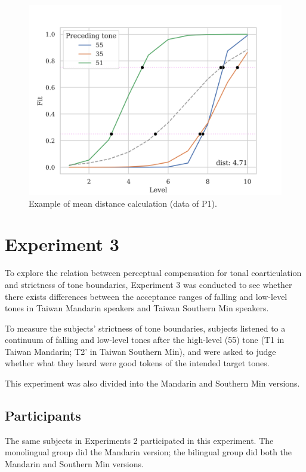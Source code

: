 \documentclass[12pt]{report}
\begin{document}
\begin{CJK}{UTF8}{bsmi}
\begin{figure}[h]
\centering
\includegraphics[width=\textwidth]{Figures/E2/ProcessedExample.png}
\caption{Example of mean distance calculation (data of P1).}
\label{Figure:E2ProcessedExample}
\end{figure}

\section{Experiment 3}\label{section:Experiment3}
To explore the relation between perceptual compensation for tonal coarticulation and strictness of tone boundaries, Experiment 3 was conducted to see whether there exists differences between the acceptance ranges of falling and low-level tones in Taiwan Mandarin speakers and Taiwan Southern Min speakers.

To measure the subjects' strictness of tone boundaries, subjects listened to a continuum of falling and low-level tones after the high-level (55) tone (T1 in Taiwan Mandarin; T2' in Taiwan Southern Min), and were asked to judge whether what they heard were good tokens of the intended target tones.

This experiment was also divided into the Mandarin and Southern Min versions.

\subsection{Participants}
The same subjects in Experiments 2 participated in this experiment. The monolingual group did the Mandarin version; the bilingual group did both the Mandarin and Southern Min versions.


\end{CJK}
\end{document}
